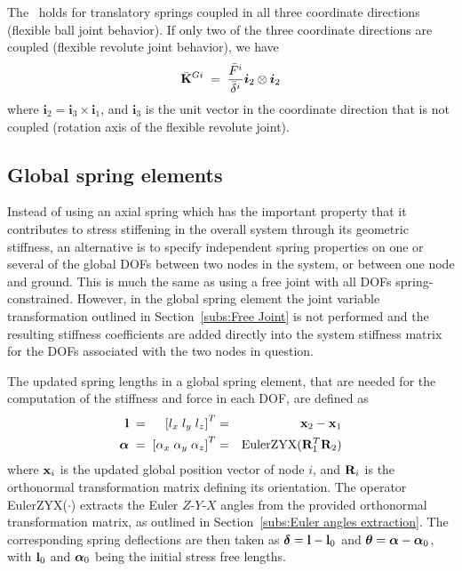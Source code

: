 The~ holds for translatory springs coupled in all three
coordinate directions (flexible ball joint behavior). If only two of the three
coordinate directions are coupled (flexible revolute joint behavior),
we have
%
\begin{equation}
\label{eq:springKbar2D}
\bar{\bf K}^{Gi} \;=\; \frac{\bar F^i}{\bar\delta^i}
\mbox{\boldmath $i$}_2\otimes\mbox{\boldmath $i$}_2
\end{equation}
%
where $\bm{i}_2=\bm{i}_3\times\bm{i}_1$, and $\bm{i}_3$ is the unit vector in
the coordinate direction that is not coupled (rotation axis of the flexible
revolute joint).

\subsection{Global spring elements}
\label{subs:Global spring}

Instead of using an axial spring which has the important property that it
contributes to stress stiffening in the overall system through its geometric
stiffness, an alternative is to specify independent spring properties on one
or several of the global DOFs between two nodes in the system,
or between one node and ground.
This is much the same as using a free joint with all DOFs spring-constrained.
However, in the global spring element the joint variable transformation
outlined in Section~\ref{subs:Free Joint} is not performed and the resulting
stiffness coefficients are added directly into the system stiffness matrix for
the DOFs associated with the two nodes in question.

The updated spring lengths in a global spring element, that are needed for the
computation of the stiffness and force in each DOF, are defined as
%
\begin{eqnarray}
{\bf l} \;=\hskip13pt \left[l_x \; l_y \; l_z\right]^T &=&
{\bf x}_2 - {\bf x}_1 \\
{\boldsymbol{\alpha}} \;=\; \left[\alpha_x \; \alpha_y \; \alpha_z\right]^T &=&
{\rm EulerZYX}({\bf R}_1^T{\bf R}_2)
\end{eqnarray}
%
where ${\bf x}_i$ is the updated global position vector of node $i$, and
${\bf R}_i$ is the orthonormal transformation matrix defining its orientation.
The operator EulerZYX($\cdot$) extracts the Euler $Z$-$Y$-$X$ angles from
the provided orthonormal transformation matrix,
as outlined in Section~\ref{subs:Euler angles extraction}.
The corresponding spring deflections are then taken as
${\boldsymbol{\delta}}={\bf l}-{\bf l}_0$ and ${\boldsymbol{\theta}}={\boldsymbol{\alpha}}-{\boldsymbol{\alpha}}_0$,
with ${\bf l}_0$ and ${\boldsymbol{\alpha}}_0$ being the initial stress free lengths.

